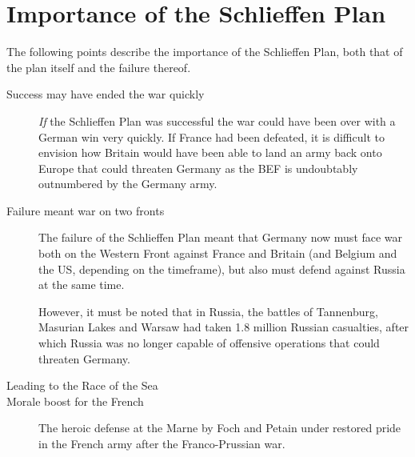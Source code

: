 \documentclass[a4paper,numbers=endperiod,most,twoside,english,final,openany]{scrbook} %
\begin{document}
\section{Importance of the Schlieffen Plan}
The following points describe the importance of the Schlieffen Plan, both that of the plan itself and the failure thereof.
\begin{description}
	\item [Success may have ended the war quickly] \emph{If} the Schlieffen Plan was successful the war could have been over with a German win very quickly.  If France had been defeated, it is difficult to envision how Britain would have been able to land an army back onto Europe that could threaten Germany as the BEF is undoubtably outnumbered by the Germany army.
	\item [Failure meant war on two fronts] The failure of the Schlieffen Plan meant that Germany now must face war both on the Western Front against France and Britain (and Belgium and the US, depending on the timeframe), but also must defend against Russia at the same time.
	
		However, it must be noted that in Russia, the battles of Tannenburg, Masurian Lakes and Warsaw had taken 1.8 million Russian casualties, after which Russia was no longer capable of offensive operations that could threaten Germany.
	\item [Leading to the Race of the Sea] 
	\item [Morale boost for the French] The heroic defense at the Marne by Foch and Petain under restored pride in the French army after the Franco-Prussian war.
\end{description}
\end{document}
